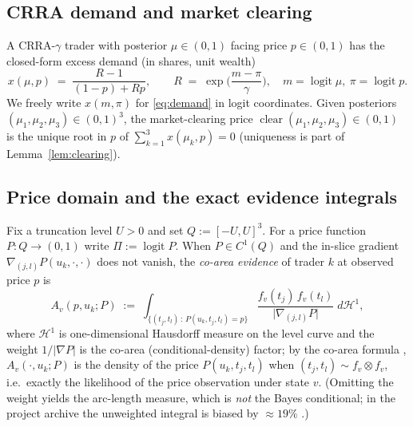 \documentclass[11pt]{article}
\theoremstyle{definition}
\newcommand{\clear}{\operatorname{clear}}
\newcommand{\Hc}{\mathcal{H}}
\begin{document}
\subsection{CRRA demand and market clearing}
A CRRA-$\gamma$ trader with posterior $\mu\in(0,1)$ facing price $p\in(0,1)$
has the closed-form excess demand (in shares, unit wealth)
\begin{equation}\label{eq:demand}
x(\mu,p)\;=\;\frac{R-1}{(1-p)+Rp},
\qquad
R\;=\;\exp\!\Big(\frac{m-\pi}{\gamma}\Big),
\quad m=\operatorname{logit}\mu,\ \pi=\operatorname{logit}p .
\end{equation}
We freely write $x(m,\pi)$ for \eqref{eq:demand} in logit coordinates.
Given posteriors $(\mu_1,\mu_2,\mu_3)\in(0,1)^3$, the market-clearing price
$\clear(\mu_1,\mu_2,\mu_3)\in(0,1)$ is the unique root in $p$ of
$\sum_{k=1}^{3}x(\mu_k,p)=0$ (uniqueness is part of
Lemma~\ref{lem:clearing}).

\subsection{Price domain and the exact evidence integrals}
Fix a truncation level $U>0$ and set $Q:=[-U,U]^3$. For a price function
$P:Q\to(0,1)$ write $\Pi:=\operatorname{logit}P$. When $P\in C^1(Q)$ and the
in-slice gradient
$\nabla_{\!(j,l)}P(u_k,\cdot,\cdot)$ does not vanish, the
\emph{co-area evidence} of trader $k$ at observed price $p$ is
\begin{equation}\label{eq:coarea}
A_v(p,u_k;P)\;:=\;
\int_{\{(t_j,t_l)\,:\,P(u_k,t_j,t_l)=p\}}
\frac{f_v(t_j)\,f_v(t_l)}{\big|\nabla_{\!(j,l)}P\big|}\;d\Hc^1 ,
\end{equation}
where $\Hc^1$ is one-dimensional Hausdorff measure on the level curve and
the weight $1/|\nabla P|$ is the co-area (conditional-density) factor; by the
co-area formula \cite{EvansGariepy}, $A_v(\cdot,u_k;P)$ is the density of the
price $P(u_k,t_j,t_l)$ when $(t_j,t_l)\sim f_v\otimes f_v$, i.e.\ exactly the
likelihood of the price observation under state $v$. (Omitting the weight
yields the arc-length measure, which is \emph{not} the Bayes conditional; in
the project archive the unweighted integral is biased by $\approx 19\%$
\cite{REZN}.)
\end{document}
